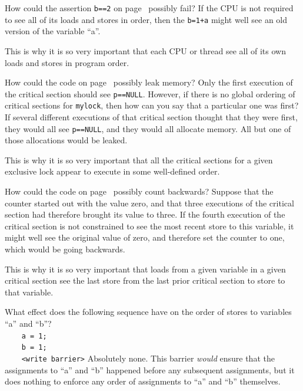 \begin{enumerate}
\QuickQ{}
	How could the assertion {\tt b==2} on
	page~\pageref{codesample:advsync:What Can You Count On? 1}
	possibly fail?
\QuickA{}
	If the CPU is not required to see all of its loads and
	stores in order, then the {\tt b=1+a} might well see an
	old version of the variable ``a''.

	This is why it is so very important that each CPU or thread
	see all of its own loads and stores in program order.

\QuickQ{}
	How could the code on
	page~\pageref{codesample:advsync:What Can You Count On? 2}
	possibly leak memory?
\QuickA{}
	Only the first execution of the critical section should
	see {\tt p==NULL}.
	However, if there is no global ordering of critical sections for
	{\tt mylock}, then how can you say that a particular one was
	first?
	If several different executions of that critical section thought
	that they were first, they would all see {\tt p==NULL}, and
	they would all allocate memory.
	All but one of those allocations would be leaked.

	This is why it is so very important that all the critical sections
	for a given exclusive lock appear to execute in some well-defined
	order.

\QuickQ{}
	How could the code on
	page~\pageref{codesample:advsync:What Can You Count On? 2}
	possibly count backwards?
\QuickA{}
	Suppose that the counter started out with the value zero,
	and that three executions of the critical section had therefore
	brought its value to three.
	If the fourth execution of the critical section is not constrained
	to see the most recent store to this variable, it might well see
	the original value of zero, and therefore set the counter to
	one, which would be going backwards.

	This is why it is so very important that loads from a given variable
	in a given critical
	section see the last store from the last prior critical section to
	store to that variable.

\QuickQ{}
	What effect does the following sequence have on the
	order of stores to variables ``a'' and ``b''? \\
	{\tt ~~~~a = 1;} \\
	{\tt ~~~~b = 1;} \\
	{\tt ~~~~<write barrier>}
\QuickA{}
	Absolutely none.  This barrier {\em would} ensure that the
	assignments to ``a'' and ``b'' happened before any subsequent
	assignments, but it does nothing to enforce any order of
	assignments to ``a'' and ``b'' themselves.


\end{enumerate}

